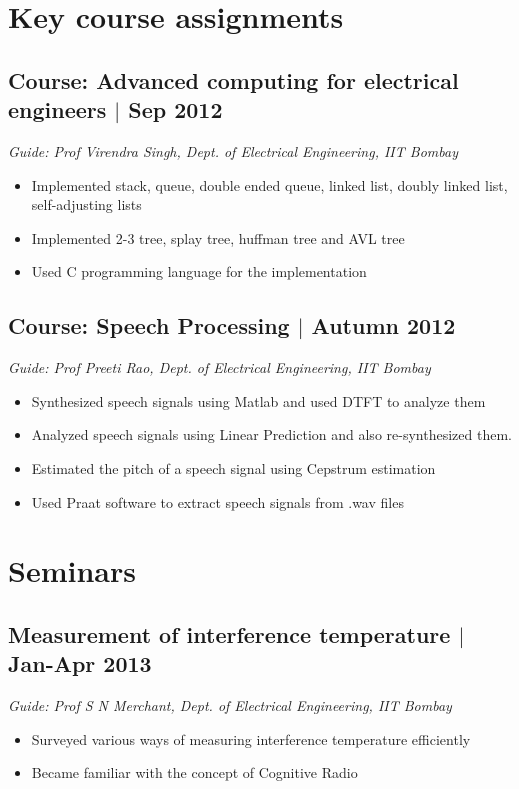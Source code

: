 \documentclass[12pt]{article}
\begin{document}
\section*{Key course assignments}
\subsection*{Course: Advanced computing for electrical engineers $\vert$ Sep 2012}
\emph{Guide: Prof Virendra Singh, Dept. of Electrical Engineering, IIT Bombay}
\begin{itemize}
\item Implemented stack, queue, double ended queue, linked list, doubly linked list, self-adjusting lists
\item Implemented 2-3 tree, splay tree,  huffman tree and AVL tree
\item Used C programming language for the implementation
\end{itemize}

\subsection*{Course: Speech Processing $\vert$ Autumn 2012}
\emph{Guide: Prof Preeti Rao, Dept. of Electrical Engineering, IIT Bombay}
\begin{itemize}
\item Synthesized speech signals using Matlab and used DTFT to analyze them
\item Analyzed speech signals using Linear Prediction and also re-synthesized them.
\item Estimated the pitch of a speech signal using Cepstrum estimation
\item Used Praat software to extract speech signals from .wav files
\end{itemize}


\section*{Seminars}
\subsection*{Measurement of interference temperature $\vert$  Jan-Apr 2013} 
\emph{Guide: Prof S N Merchant, Dept. of Electrical Engineering, IIT Bombay}
\begin{itemize}  
\item Surveyed various ways of measuring interference temperature efficiently 
\item Became familiar with the concept of Cognitive Radio
\end{itemize}
  
\end{document}
